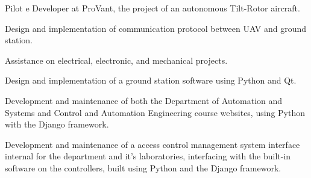 \documentclass[A4]{deedy-resume} %
\begin{document}
\begin{minipage}[t]{0.66\textwidth}
\vspace{\topsep} %


\vspace{\topsep} %
\begin{tightitemize}
 \item Pilot e Developer at ProVant, the project of an autonomous  Tilt-Rotor aircraft.
 \item Design and implementation of communication protocol between UAV and ground station.
 \item Assistance on electrical, electronic, and mechanical projects.
 \item Design and implementation of a ground station software using  Python and Qt.

\end{tightitemize}

\sectionspace %

\vspace{\topsep} %
\begin{tightitemize}
 \item Development and maintenance of both the Department of Automation and Systems and Control and Automation Engineering course websites, using Python with the Django framework.
\end{tightitemize}

\sectionspace %

\vspace{\topsep} %
\begin{tightitemize}
 \item Development and maintenance of a access control management system interface internal for the department and it's laboratories, interfacing with the built-in software on the controllers, built using Python and the Django framework.
\end{tightitemize}

\sectionspace %




\end{minipage}
\end{document}
